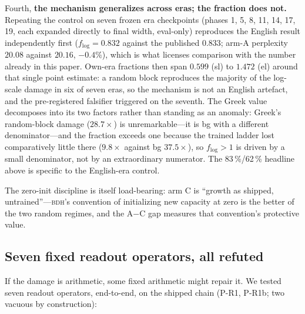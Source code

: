 \documentclass[11pt]{article}
\theoremstyle{definition}\newtheorem{definition}{Definition}
\theoremstyle{remark}\newtheorem{remark}{Remark}
\newcommand{\BDH}{\textsc{bdh}}
\begin{document}
Fourth, \textbf{the mechanism generalizes across eras; the fraction does not.} Repeating
the control on seven frozen era checkpoints (phases 1, 5, 8, 11, 14, 17, 19, each expanded
directly to final width, eval-only) reproduces the English result independently first
($f_{\log}=0.832$ against the published $0.833$; arm-A perplexity $20.08$ against
$20.16$, $-0.4\%$), which is what licenses comparison with the number already in this
paper. Own-era fractions then span $0.599$ (sl) to $1.472$ (el) around that single point
estimate: a random block reproduces the majority of the log-scale damage in six of seven
eras, so the mechanism is not an English artefact, and the pre-registered falsifier
triggered on the seventh. The Greek value decomposes into its two factors rather than
standing as an anomaly: Greek's random-block damage ($28.7\times$) is unremarkable---it is
bg with a different denominator---and the fraction exceeds one because the trained ladder
lost comparatively little there ($9.8\times$ against bg $37.5\times$), so $f_{\log}>1$ is
driven by a small denominator, not by an extraordinary numerator. The 83\,\%/62\,\%
headline above is specific to the English-era control.

The zero-init discipline is itself load-bearing: arm C is ``growth as shipped,
untrained''---\BDH{}'s convention of initializing new capacity at zero is the better of
the two random regimes, and the A$-$C gap measures that convention's protective value.

\subsection{Seven fixed readout operators, all refuted}

If the damage is arithmetic, some fixed arithmetic might repair it. We tested seven
readout operators, end-to-end, on the shipped chain (P-R1, P-R1b; two vacuous by
construction):
\end{document}
